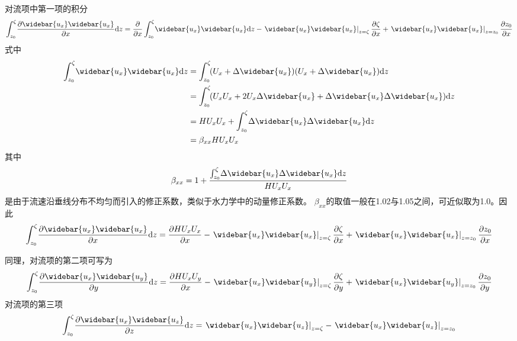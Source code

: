 对流项中第一项的积分
\begin{equation}
    \int_{z_0}^{\zeta}\!
    \frac{\partial \widebar{u_{x}}\widebar{u_{x}}}{\partial x}
    \mathrm{d}z
    =
    \frac{\partial}{\partial x}
    \int_{z_0}^{\zeta}\!
    \widebar{u_{x}}\widebar{u_{x}}
    \mathrm{d}z
    -
    \left.\widebar{u_{x}}\widebar{u_{x}}\right|_{z=\zeta}\frac{\partial \zeta}{\partial x}
    +
    \left.\widebar{u_{x}}\widebar{u_{x}}\right|_{z=z_{0}}\frac{\partial z_{0}}{\partial x}
    \label{EqCGe_CT_1st}
\end{equation}
式中
\begin{equation*}
    \begin{aligned}
    \int_{z_0}^{\zeta}\!
    \widebar{u_{x}}\widebar{u_{x}}
    \mathrm{d}z
    &=
    \int_{z_0}^{\zeta}\!
    (U_{x}+\Delta\widebar{u_{x}})(U_{x}+\Delta\widebar{u_{x}})
    \mathrm{d}z
    \\
    &=
    \int_{z_0}^{\zeta}\!
    (U_{x}U_{x}+2U_{x}\Delta\widebar{u_{x}}+\Delta\widebar{u_{x}}\Delta\widebar{u_{x}})
    \mathrm{d}z
    \\
    &=
    HU_{x}U_{x}
    +
    \int_{z_0}^{\zeta}\!
    \Delta\widebar{u_{x}}\Delta\widebar{u_{x}}
    \mathrm{d}z
    \\
    &=
    \beta_{xx}HU_{x}U_{x}
    \end{aligned}
\end{equation*}
其中
\begin{equation}
\beta_{xx}
=
1 +
\frac
{
\int_{z_0}^{\zeta}\!
    \Delta\widebar{u_{x}}\Delta\widebar{u_{x}}
\mathrm{d}z
}
{HU_{x}U_{x}}
\end{equation}
是由于流速沿垂线分布不均匀而引入的修正系数，类似于水力学中的动量修正系数。
$\beta_{xx}$的取值一般在1.02与1.05之间，可近似取为1.0。因此
\begin{equation}
    \int_{z_0}^{\zeta}\!
    \frac{\partial \widebar{u_{x}}\widebar{u_{x}}}{\partial x}
    \mathrm{d}z
    =
    \frac{\partial HU_{x}U_{x}}{\partial x}
    -
    \left.\widebar{u_{x}}\widebar{u_{x}}\right|_{z=\zeta}\frac{\partial \zeta}{\partial x}
    +
    \left.\widebar{u_{x}}\widebar{u_{x}}\right|_{z=z_{0}}\frac{\partial z_{0}}{\partial x}
\end{equation}

同理，对流项的第二项可写为
\begin{equation}
    \int_{z_0}^{\zeta}\!
    \frac{\partial \widebar{u_{x}}\widebar{u_{y}}}{\partial y}
    \mathrm{d}z
    =
    \frac{\partial HU_{x}U_{y}}{\partial x}
    -
    \left.\widebar{u_{x}}\widebar{u_{y}}\right|_{z=\zeta}\frac{\partial \zeta}{\partial y}
    +
    \left.\widebar{u_{x}}\widebar{u_{y}}\right|_{z=z_{0}}\frac{\partial z_{0}}{\partial y}
\end{equation}
对流项的第三项
\begin{equation}
    \int_{z_0}^{\zeta}\!
    \frac{\partial \widebar{u_{x}}\widebar{u_{z}}}{\partial z}
    \mathrm{d}z
    =
    \left.\widebar{u_{x}}\widebar{u_{z}}\right|_{z=\zeta}
    -
    \left.\widebar{u_{x}}\widebar{u_{z}}\right|_{z=z_{0}}
\end{equation}

